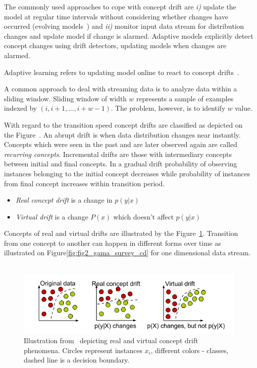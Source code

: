 The commonly used approaches to cope with concept drift are \textit{i)} update the model at regular time intervals without considering whether changes have occurred (evolving models~\cite{SouzaChallenges2020}) and \textit{ii)} monitor input data stream for distribution changes and update model if change is alarmed. 
Adaptive models explicitly detect concept changes using drift detectors, updating models when changes are alarmed.  

Adaptive learning refers to updating model online to react to concept drifts~\cite{gama2014survey}.

A common approach to deal with streaming data is to analyze data within a sliding window. 
Sliding window of width $w$ represents a sample of examples indexed by $(i, i+1, \dots, i+w-1)$. 
The problem, however, is to identify $w$ value.

With regard to the transition speed concept drifts are classified as depicted on the Figure~\cite{fig:souza_cd_speeds}.
An abrupt drift is when data distribution changes near instantly.
Concepts which were seen in the past and are later observed again are called \textit{recurring concepts}.
Incremental drifts are those with intermediary concepts between initial and final concepts.
In a gradual drift probability of observing instances belonging to the initial concept decreases while probability of instances from final concept increases within transition period.

\begin{itemize}
  \item \textit{Real concept drift}\cite{gama2014survey,gao2007general, salganicoff1997tolerating} is a change in $p(y|x)$
  \item \textit{Virtual drift}\cite{delany2004case,tsymbal2004problem,widmer1993effective} is a change $P(x)$ which doesn't affect $p(y|x)$
\end{itemize}

Concepts of real and virtual drifts are illustrated by the Figure~\ref{fig:fig1_gama_survey_cd}.
Transition from one concept to another can happen in different forms over time as illustrated on Figure\ref{fig:fig2_gama_survey_cd} for one dimensional data stream.  
~\cite{karkkainen2014region}

\begin{figure}[htb!]
	\centering
	\includegraphics[height=0.15\textheight]{images/images_cropped/gama_survey_cd_fig1}
	\caption{Illustration from~\cite{gama2014survey} depicting real and virtual concept drift phenomena. Circles represent instances $x_i$, different colors - classes, dashed line is a decision boundary. }\label{fig:fig1_gama_survey_cd}
\end{figure}

